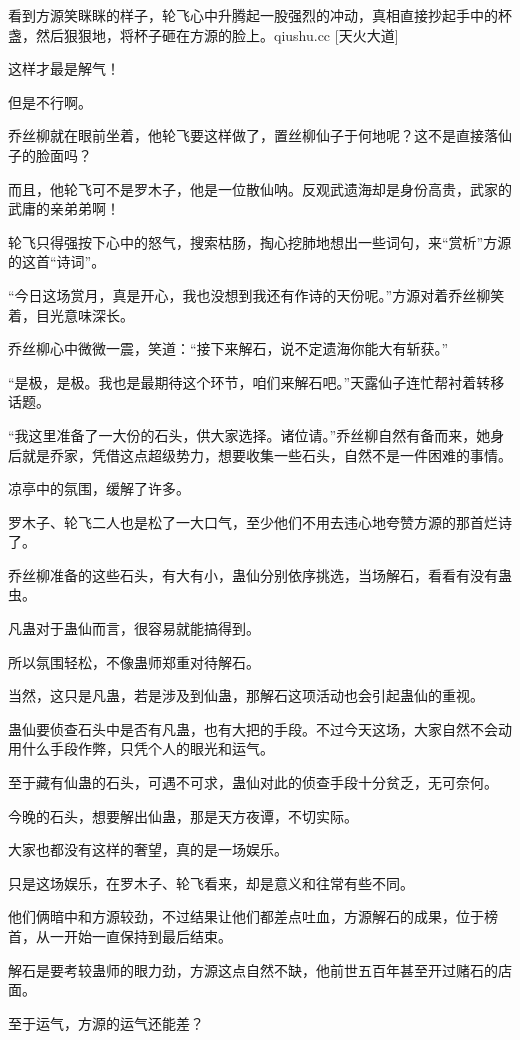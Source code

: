 \begin{this_body}
看到方源笑眯眯的样子，轮飞心中升腾起一股强烈的冲动，真相直接抄起手中的杯盏，然后狠狠地，将杯子砸在方源的脸上。qiushu.cc [天火大道]

这样才最是解气！

但是不行啊。

乔丝柳就在眼前坐着，他轮飞要这样做了，置丝柳仙子于何地呢？这不是直接落仙子的脸面吗？

而且，他轮飞可不是罗木子，他是一位散仙呐。反观武遗海却是身份高贵，武家的武庸的亲弟弟啊！

轮飞只得强按下心中的怒气，搜索枯肠，掏心挖肺地想出一些词句，来“赏析”方源的这首“诗词”。

“今日这场赏月，真是开心，我也没想到我还有作诗的天份呢。”方源对着乔丝柳笑着，目光意味深长。

乔丝柳心中微微一震，笑道：“接下来解石，说不定遗海你能大有斩获。”

“是极，是极。我也是最期待这个环节，咱们来解石吧。”天露仙子连忙帮衬着转移话题。

“我这里准备了一大份的石头，供大家选择。诸位请。”乔丝柳自然有备而来，她身后就是乔家，凭借这点超级势力，想要收集一些石头，自然不是一件困难的事情。

凉亭中的氛围，缓解了许多。

罗木子、轮飞二人也是松了一大口气，至少他们不用去违心地夸赞方源的那首烂诗了。

乔丝柳准备的这些石头，有大有小，蛊仙分别依序挑选，当场解石，看看有没有蛊虫。

凡蛊对于蛊仙而言，很容易就能搞得到。

所以氛围轻松，不像蛊师郑重对待解石。

当然，这只是凡蛊，若是涉及到仙蛊，那解石这项活动也会引起蛊仙的重视。

蛊仙要侦查石头中是否有凡蛊，也有大把的手段。不过今天这场，大家自然不会动用什么手段作弊，只凭个人的眼光和运气。

至于藏有仙蛊的石头，可遇不可求，蛊仙对此的侦查手段十分贫乏，无可奈何。

今晚的石头，想要解出仙蛊，那是天方夜谭，不切实际。

大家也都没有这样的奢望，真的是一场娱乐。

只是这场娱乐，在罗木子、轮飞看来，却是意义和往常有些不同。

他们俩暗中和方源较劲，不过结果让他们都差点吐血，方源解石的成果，位于榜首，从一开始一直保持到最后结束。

解石是要考较蛊师的眼力劲，方源这点自然不缺，他前世五百年甚至开过赌石的店面。

至于运气，方源的运气还能差？


\end{this_body}
